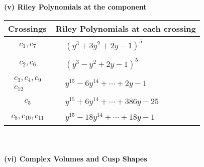 \documentclass[1p]{elsarticle_modified}
\theoremstyle{definition}
\begin{document}
\newpage\renewcommand{\arraystretch}{1}
\flushleft \textbf{(v) Riley Polynomials at the component}\newline \\
\begin{tabular}{m{50pt}|m{274pt}}
Crossings & \hspace{64pt}Riley Polynomials at each crossing \\
\hline $$\begin{aligned}c_{1},c_{7}\end{aligned}$$&$\begin{aligned}
&(y^3+3 y^2+2 y-1)^5
\end{aligned}$\\
\hline $$\begin{aligned}c_{2},c_{6}\end{aligned}$$&$\begin{aligned}
&(y^3- y^2+2 y-1)^5
\end{aligned}$\\
\hline $$\begin{aligned}c_{3},c_{4},c_{9}\\c_{12}\end{aligned}$$&$\begin{aligned}
&y^{15}-6 y^{14}+\cdots+2 y-1
\end{aligned}$\\
\hline $$\begin{aligned}c_{5}\end{aligned}$$&$\begin{aligned}
&y^{15}+6 y^{14}+\cdots+386 y-25
\end{aligned}$\\
\hline $$\begin{aligned}c_{8},c_{10},c_{11}\end{aligned}$$&$\begin{aligned}
&y^{15}-18 y^{14}+\cdots+18 y-1
\end{aligned}$\\
\hline
\end{tabular}\\~\\
\newpage\flushleft \textbf{(vi) Complex Volumes and Cusp Shapes}
\end{document}

